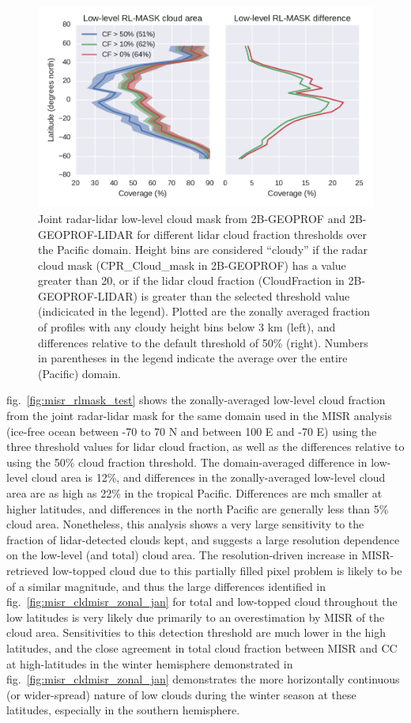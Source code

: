 \begin{figure}[htbp]
\centering
\includegraphics{graphics/misr_rlmask_test.pdf}
\caption{\label{fig:misr_rlmask_test}Joint radar-lidar low-level cloud
mask from 2B-GEOPROF and 2B-GEOPROF-LIDAR for different lidar cloud
fraction thresholds over the Pacific domain. Height bins are considered
``cloudy'' if the radar cloud mask (CPR\_Cloud\_mask in 2B-GEOPROF) has
a value greater than 20, or if the lidar cloud fraction (CloudFraction
in 2B-GEOPROF-LIDAR) is greater than the selected threshold value
(indicicated in the legend). Plotted are the zonally averaged fraction
of profiles with any cloudy height bins below 3 km (left), and
differences relative to the default threshold of 50\% (right). Numbers
in parentheses in the legend indicate the average over the entire
(Pacific) domain.}\label{fig:misrux5frlmaskux5ftest}
\end{figure}

fig.~\ref{fig:misr_rlmask_test} shows the zonally-averaged low-level
cloud fraction from the joint radar-lidar mask for the same domain used
in the MISR analysis (ice-free ocean between -70 to 70 N and between 100
E and -70 E) using the three threshold values for lidar cloud fraction,
as well as the differences relative to using the 50\% cloud fraction
threshold. The domain-averaged difference in low-level cloud area is
12\%, and differences in the zonally-averaged low-level cloud area are
as high as 22\% in the tropical Pacific. Differences are mch smaller at
higher latitudes, and differences in the north Pacific are generally
less than 5\% cloud area. Nonetheless, this analysis shows a very large
sensitivity to the fraction of lidar-detected clouds kept, and suggests
a large resolution dependence on the low-level (and total) cloud area.
The resolution-driven increase in MISR-retrieved low-topped cloud due to
this partially filled pixel problem is likely to be of a similar
magnitude, and thus the large differences identified in
fig.~\ref{fig:misr_cldmisr_zonal_jan} for total and low-topped cloud
throughout the low latitudes is very likely due primarily to an
overestimation by MISR of the cloud area. Sensitivities to this
detection threshold are much lower in the high latitudes, and the close
agreement in total cloud fraction between MISR and CC at high-latitudes
in the winter hemisphere demonstrated in
fig.~\ref{fig:misr_cldmisr_zonal_jan} demonstrates the more horizontally
continuous (or wider-spread) nature of low clouds during the winter
season at these latitudes, especially in the southern hemisphere.

